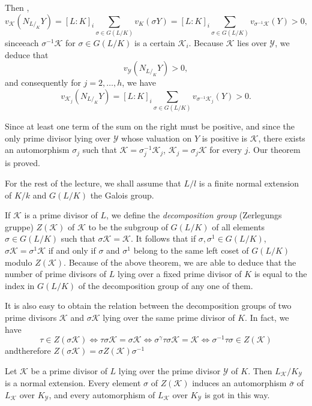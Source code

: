 Then ,
{\fontsize{10pt}{12pt}\selectfont
$$
v_\mathscr{K}(N_{L / _K}Y) = [L:K]_i \sum_{\sigma \in G(L/K)} v_K
(\sigma Y) = [L:K]_i \sum_{\sigma \in G (L
  /K)} v_{\sigma^{-1}\mathscr{K}} (Y) > 0 , 
$$}\relax
since\pageoriginale each  $\sigma^{-1} \mathscr{K}$ for $\sigma \in  G(L /K)$ is a
certain $\mathscr{K}_i$. Because $\mathscr{K}$ lies over
$\mathscr{Y}$, we deduce that  
$$
v_\mathscr{Y}(N_{L /_K}Y) > 0,
$$
and consequently for $j=2,\ldots , h$, we have 
$$
v_{\mathscr{K}_j}(N_{L/ _K} Y) = [L : K]_i \sum_{\sigma \in G(L/
  K)} v_{\sigma^{-1} \mathscr{K}_j} (Y) > 0. 
$$

Since at least one term of the sum on the right must be positive, and
since the only prime divisor lying over $\mathscr{Y}$ whose valuation
on $Y$ is positive is $\mathscr{K}$, there exists an automorphism
$\sigma_j$ such that $\mathscr{K}= \sigma_j^{-1} \mathscr{K}_j$,
$\mathscr{K}_j = \sigma_j \mathscr{K}$ for every $j$. Our theorem is
proved. 

For the rest of the lecture, we shall assume that $L /l$ is a finite
normal extension  of $K/k$ and $G(L /K)$ the Galois group. 

If $\mathscr{K}$ is a prime divisor of $L$, we define the
\textit{decomposition group} (Zerlegungs gruppe) $Z(\mathscr{K})$ of
$\mathscr{K}$ to be the subgroup of $G(L /K)$ of all elements $\sigma
\in G(L /K)$ such that $\sigma \mathscr{K} = \mathscr{K}$. It follows
that if $\sigma, \sigma^1 \in G(L /K)$, $\sigma \mathscr{K} =
\sigma^{1} \mathscr{K}$ if and only if $\sigma$ and $\sigma^1$  belong
to the same left coset of $G(L /K)$ modulo $Z (\mathscr{K})$. Because
of the above theorem, we are able to deduce that the number of prime
divisors of $L$ lying over a fixed prime divisor of $K$ is equal to
the index in $G(L /K)$ of the decomposition  group of any one of
them. 

It is also easy to obtain the relation  between the decomposition
groups of two  prime divisors $\mathscr{K}$ and $\sigma \mathscr{K}$
lying over the same prime divisor of $K$. In fact, we have  
$$
\tau  \in Z(\sigma \mathscr{K}) \Leftrightarrow \tau  \sigma
\mathscr{K} = \sigma \mathscr{K} \Leftrightarrow \sigma^\gamma
\tau  \sigma \mathscr{K} = \mathscr{K} \Leftrightarrow \sigma^{-1}
\tau  \sigma \in Z (\mathscr{K}) 
$$
and\pageoriginale therefore $Z(\sigma \mathscr{K}) = \sigma Z (\mathscr{K}) \sigma^{-1}$

\begin{theorem*}%
  Let $\mathscr{K}$ be a prime divisor of $L$ lying over the prime
  divisor $\mathscr{Y}$ of  $K$. Then $L_{\mathscr{K}} /
  K_{\mathscr{Y}}$ is a normal extension. Every element $\sigma$ of
  $Z(\mathscr{K})$ induces an automorphism $\bar{\sigma}$ of
  $L_{\mathscr{K}}$ over $K_{\mathscr{Y}}$, and every  automorphism of
  $L_{\mathscr{K}}$ over $K_{\mathscr{Y}}$ is got in this way. 
\end{theorem*}

